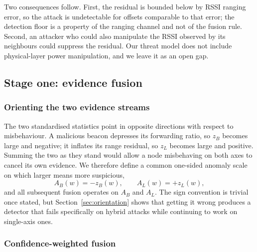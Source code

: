 Two consequences follow. First, the residual is bounded below by RSSI ranging
error, so the attack is undetectable for offsets comparable to that error; the
detection floor is a property of the ranging channel and not of the fusion
rule. Second, an attacker who could also manipulate the RSSI observed by its
neighbours could suppress the residual. Our threat model does not include
physical-layer power manipulation, and we leave it as an open gap.

\subsection{Stage one: evidence fusion}

\subsubsection{Orienting the two evidence streams}

The two standardised statistics point in opposite directions with respect to
misbehaviour. A malicious beacon depresses its forwarding ratio, so $z_B$
becomes large and negative; it inflates its range residual, so $z_L$ becomes
large and positive. Summing the two as they stand would allow a node
misbehaving on both axes to cancel its own evidence. We therefore define a
common one-sided anomaly scale on which larger means more suspicious,
\begin{equation}
\label{eq:orient}
A_B(w) = -z_B(w), \qquad A_L(w) = +z_L(w),
\end{equation}
and all subsequent fusion operates on $A_B$ and $A_L$. The sign convention is
trivial once stated, but Section~\ref{sec:orientation} shows that getting it
wrong produces a detector that fails specifically on hybrid attacks while
continuing to work on single-axis ones.

\subsubsection{Confidence-weighted fusion}

